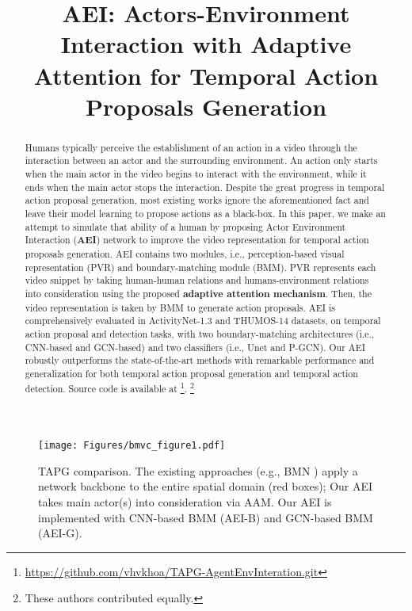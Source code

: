 \documentclass{bmvc2k}
\title{AEI: Actors-Environment Interaction with Adaptive Attention for Temporal Action Proposals Generation}
\newcommand\blfootnote[1]{\begingroup
  \renewcommand\thefootnote{}\footnote{#1}\addtocounter{footnote}{-1}\endgroup
}
\begin{document}
\maketitle

\begin{abstract}
Humans typically perceive the establishment of an action in a video through the interaction between an actor and the surrounding environment. An action only starts when the main actor in the video begins to interact with the environment, while it ends when the main actor stops the interaction. Despite the great progress in temporal action proposal generation, most existing works ignore the aforementioned fact and leave their model learning to propose actions as a black-box. In this paper, we make an attempt to simulate that ability of a human by proposing Actor Environment Interaction (\textbf{AEI}) network to improve the video representation for temporal action proposals generation. AEI contains two modules, i.e., perception-based visual representation (PVR) and boundary-matching module (BMM). PVR represents each video snippet by taking human-human relations and humans-environment relations into consideration using the proposed \textbf{adaptive attention mechanism}. Then, the video representation is taken by BMM to generate action proposals. AEI is comprehensively evaluated in ActivityNet-1.3 and THUMOS-14 datasets, on temporal action proposal and detection tasks, with two boundary-matching architectures (i.e., CNN-based and GCN-based) and two classifiers (i.e., Unet and P-GCN). Our AEI robustly outperforms the state-of-the-art methods with remarkable performance and generalization for both temporal action proposal generation and temporal action detection. Source code is available at \footnote{\url{https://github.com/vhvkhoa/TAPG-AgentEnvInteration.git}}.
\blfootnote{These authors contributed equally.}


\end{abstract}



\vspace*{-\baselineskip}

\begin{figure}[t]
\centering
  \texttt{[image: Figures/bmvc\_figure1.pdf]}
  \vspace*{-0.1cm}
  \caption{TAPG comparison. The existing approaches (e.g., BMN \cite{bmn}) apply a network backbone to the entire spatial domain (red boxes); Our AEI takes main actor(s) into consideration via AAM. Our AEI is implemented with CNN-based BMM (AEI-B) and GCN-based BMM (AEI-G).}
  \vspace*{-0.4cm}
  \label{qualitative}
\end{figure}
\end{document}
